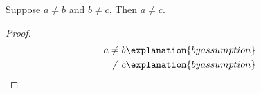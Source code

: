

\begin{proposition}\label{calculation_missing_law}
    Suppose $a\neq b$ and $b\neq c$.
    Then $a\neq c$.
\end{proposition}
\begin{proof}
    \begin{align*} a &\neq b \explanation{by assumption} \\ &\neq c \explanation{by assumption} \end{align*}
\end{proof}
